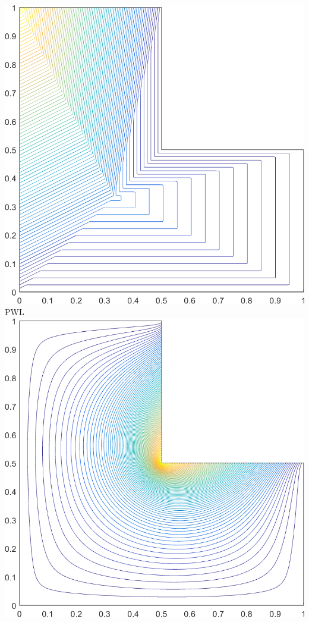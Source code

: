 \documentclass[compress,10pt]{beamer}
\begin{document}
\begin{frame}[t]
{\begin{columns}
\vspace{3mm}
{}\includegraphics[width=0.85\columnwidth]{images/L-domain_PWLD1_contour_b6.png}\\
PWL\\ 
\centering
{}\includegraphics[width=0.85\columnwidth]{images/L-domain_MV1_contour_b4.png} \\
\vspace{3mm}

\end{columns}}
\end{frame}
\end{document}
